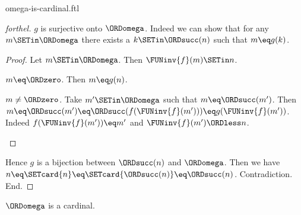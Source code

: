 \documentclass{stex}
\begin{document}
\begin{smodule}{omega-is-cardinal.ftl}
\begin{proof}[forthel]
    $g$ is surjective onto $\ORDomega$.
    Indeed we can show that for any $m \SETin \ORDomega$ there exists a $k \SETin \ORDsucc(n)$ such that $m \eq g(k)$.
    \begin{proof}
      Let $m \SETin \ORDomega$.
      Then $\FUNinv{f}(m) \SETin n$.

      \begin{case}{$m \eq \ORDzero$.}
        Then $m \eq g(n)$.
      \end{case}

      \begin{case}{$m \neq \ORDzero$.}
        Take $m' \SETin \ORDomega$ such that $m \eq \ORDsucc(m')$.
        Then $m
          \eq \ORDsucc(m')
          \eq \ORDsucc(f(\FUNinv{f}(m')))
          \eq g(\FUNinv{f}(m'))$.
        Indeed $f(\FUNinv{f}(m')) \eq m'$ and $\FUNinv{f}(m') \ORDless n$.
      \end{case}
    \end{proof}

    Hence $g$ is a bijection between $\ORDsucc(n)$ and $\ORDomega$.
    Then we have $n
      \eq \SETcard{n}
      \eq \SETcard{\ORDsucc(n)}
      \eq \ORDsucc(n)$.
    Contradiction.
  End.
\end{proof}

\begin{corollary}[forthel,id=SET_THEORY_07_2717623053713408]
  $\ORDomega$ is a cardinal.
\end{corollary}
\end{smodule}
\end{document}

